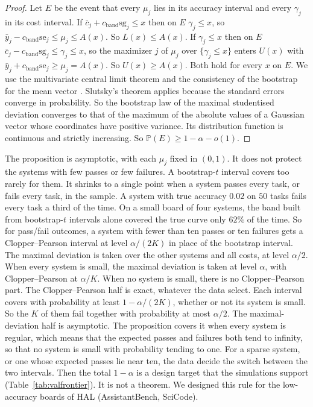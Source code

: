 \documentclass[11pt]{article}
\renewcommand{\Pr}{\mathbb{P}}
\newcommand{\se}{\mathrm{se}}
\begin{document}
\begin{proof}
Let $E$ be the event that every $\mu_j$ lies in its accuracy interval and every $\gamma_j$ in its cost interval. If $\bar c_j+c_{\mathrm{band}}\mathrm{sg}_j\le x$ then on $E$ $\gamma_j\le x$, so $\bar y_j-c_{\mathrm{band}}\se_j\le\mu_j\le A(x)$. So $L(x)\le A(x)$. If $\gamma_j\le x$ then on $E$ $\bar c_j-c_{\mathrm{band}}\mathrm{sg}_j\le\gamma_j\le x$, so the maximizer $j$ of $\mu_j$ over $\{\gamma_j\le x\}$ enters $U(x)$ with $\bar y_j+c_{\mathrm{band}}\se_j\ge\mu_j=A(x)$. So $U(x)\ge A(x)$. Both hold for every $x$ on $E$. We use the multivariate central limit theorem and the consistency of the bootstrap for the mean vector \citep{bickel1981bootstrap}. Slutsky's theorem applies because the standard errors converge in probability. So the bootstrap law of the maximal studentised deviation converges to that of the maximum of the absolute values of a Gaussian vector whose coordinates have positive variance. Its distribution function is continuous and strictly increasing. So $\Pr(E)\ge1-\alpha-o(1)$.
\end{proof}
The proposition is asymptotic, with each $\mu_j$ fixed in $(0,1)$. It does not protect the systems with few passes or few failures. A bootstrap-$t$ interval covers too rarely for them. It shrinks to a single point when a system passes every task, or fails every task, in the sample. A system with true accuracy $0.02$ on $50$ tasks fails every task a third of the time. On a small board of four systems, the band built from bootstrap-$t$ intervals alone covered the true curve only $62\%$ of the time. So for pass/fail outcomes, a system with fewer than ten passes or ten failures gets a Clopper--Pearson interval at level $\alpha/(2K)$ in place of the bootstrap interval. The maximal deviation is taken over the other systems and all costs, at level $\alpha/2$. When every system is small, the maximal deviation is taken at level $\alpha$, with Clopper--Pearson at $\alpha/K$. When no system is small, there is no Clopper--Pearson part. The Clopper--Pearson half is exact, whatever the data select. Each interval covers with probability at least $1-\alpha/(2K)$, whether or not its system is small. So the $K$ of them fail together with probability at most $\alpha/2$. The maximal-deviation half is asymptotic. The proposition covers it when every system is regular, which means that the expected passes and failures both tend to infinity, so that no system is small with probability tending to one. For a sparse system, or one whose expected passes lie near ten, the data decide the switch between the two intervals. Then the total $1-\alpha$ is a design target that the simulations support (Table~\ref{tab:valfrontier}). It is not a theorem. We designed this rule for the low-accuracy boards of HAL (AssistantBench, SciCode).
\end{document}
